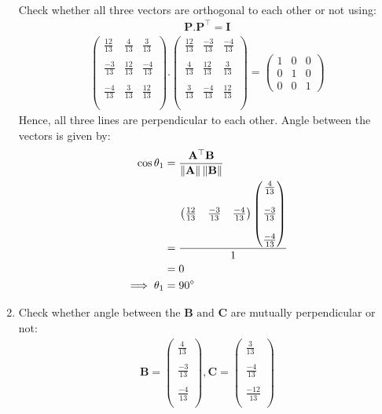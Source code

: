 \documentclass[12pt]{article}
\providecommand{\norm}[1]{\left\lVert#1\right\rVert}
\newcommand{\myvec}[1]{\ensuremath{\begin{pmatrix}#1\end{pmatrix}}}
\let\vec\mathbf
\begin{document}
\begin{enumerate}
\begin{align}
		\end{align}
	Check whether all three vectors are orthogonal to each other or not using:
		\begin{align}
		\vec{P}.\vec{P}^\top=\vec{I}
		\end{align}
		\begin{align}
	\myvec{\frac{12}{13}&\frac{4}{13}    &\frac{3}{13}\\\\ \frac{-3}{13}&\frac{12}{13}&\frac{-4}{13}\\\\ \frac{-4}{13}&\frac{3}{13}&\frac{12}{13}\\\\}.\myvec{\frac{12}{13}&\frac{-3}{13}   &\frac{-4}{13}\\\\ \frac{4}{13}&\frac{12}{13}&\frac{3}{13}\\\\ \frac{3}{13}&\frac{-4}{13}&\frac{12}{13}\\\\}=\myvec{1&0&0\\0&1&0\\0&0&1}
		\end{align}
		Hence, all three lines are perpendicular to each other.
	Angle between the vectors is given by:
		\begin{align}
			\cos\theta_1&=\frac{\vec{A}^\top\vec{B}}{\norm{\vec{A}}\norm{\vec{B}}}\\
			&=\frac{\myvec{\frac{12}{13}&\frac{-3}{13}&\frac{-4}{13}}\myvec{\frac{4}{13}\\\\\frac{-3}{13}\\\\\frac{-4}{13}\\}}{1}\\
			&=0\\
			\implies \theta_1&=90\degree
		\end{align}
	\item Check whether angle between the $\vec{B} \text{ and } \vec{C}$ are mutually perpendicular or not:
                  \begin{align}
  \vec{B}=\myvec{\frac{4}{13}\\\\\frac{-3}{13}\\\\\frac{-4}{13}\\},\vec{C}=\myvec{\frac{3}{13}\\\\\frac{-4}{13}\\\\\frac{-12}{13}\\}

\end{align}
\end{enumerate}
\end{document}
